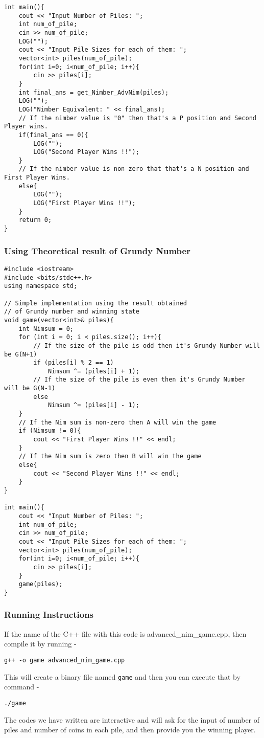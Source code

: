 \documentclass[11pt]{article}
\begin{document}
\begin{verbatim}
int main(){
    cout << "Input Number of Piles: ";
    int num_of_pile;
    cin >> num_of_pile;
    LOG("");
    cout << "Input Pile Sizes for each of them: ";
    vector<int> piles(num_of_pile);
    for(int i=0; i<num_of_pile; i++){
        cin >> piles[i];
    }
    int final_ans = get_Nimber_AdvNim(piles);
    LOG("");
    LOG("Nimber Equivalent: " << final_ans);
    // If the nimber value is "0" then that's a P position and Second Player wins.
    if(final_ans == 0){
        LOG("");
        LOG("Second Player Wins !!");
    }
    // If the nimber value is non zero that that's a N position and First Player Wins.
    else{
        LOG("");
        LOG("First Player Wins !!");
    }
    return 0;
}
\end{verbatim}

\subsubsection{Using Theoretical result of Grundy Number}
\begin{verbatim}
#include <iostream>
#include <bits/stdc++.h>
using namespace std;

// Simple implementation using the result obtained 
// of Grundy number and winning state
void game(vector<int>& piles){
    int Nimsum = 0;
    for (int i = 0; i < piles.size(); i++){
        // If the size of the pile is odd then it's Grundy Number will be G(N+1)
        if (piles[i] % 2 == 1)
            Nimsum ^= (piles[i] + 1);
        // If the size of the pile is even then it's Grundy Number will be G(N-1)
        else
            Nimsum ^= (piles[i] - 1);
    }
    // If the Nim sum is non-zero then A will win the game
    if (Nimsum != 0){
        cout << "First Player Wins !!" << endl;
    }
    // If the Nim sum is zero then B will win the game
    else{
        cout << "Second Player Wins !!" << endl;
    }
}

int main(){
    cout << "Input Number of Piles: ";
    int num_of_pile;
    cin >> num_of_pile;
    cout << "Input Pile Sizes for each of them: ";
    vector<int> piles(num_of_pile);
    for(int i=0; i<num_of_pile; i++){
        cin >> piles[i];
    }
    game(piles);
}
\end{verbatim}

\subsubsection{Running Instructions}
If the name of the C++ file with this code is advanced\_nim\_game.cpp, then compile it by running -
\begin{center}
    \texttt{g++ -o game advanced\_nim\_game.cpp}
\end{center}
This will create a binary file named \texttt{game} and then you can execute that by command -
\begin{center}
    \texttt{./game}
\end{center}
The codes we have written are interactive and will ask for the input of number of piles and number of coins in each pile, and then provide you the winning player. 
\end{document}
